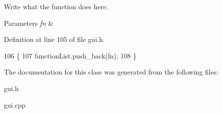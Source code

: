Write what the function does here. 


\begin{DoxyParams}{Parameters}
{\em fn} & \\
\hline
\end{DoxyParams}


Definition at line 105 of file gui.\+h.


\begin{DoxyCode}
106     \{
107         functionList.push\_back(fn);
108     \}
\end{DoxyCode}


The documentation for this class was generated from the following files\+:\begin{DoxyCompactItemize}
\item 
gui.\+h\item 
gui.\+cpp\end{DoxyCompactItemize}
